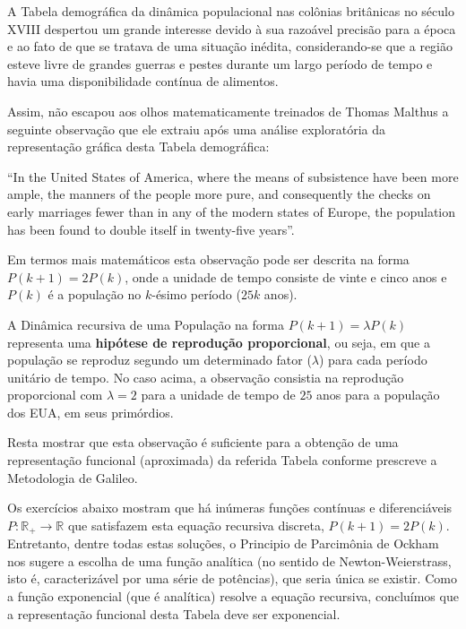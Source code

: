     A Tabela demográfica da dinâmica populacional nas colônias britânicas no século XVIII despertou um grande interesse devido à sua razoável precisão para a época e ao fato de que se tratava de uma situação inédita, considerando-se que a região esteve livre de grandes guerras e pestes durante um largo período de tempo e havia uma disponibilidade contínua de alimentos.

    Assim, não escapou aos olhos matematicamente treinados de Thomas Malthus a seguinte observação que ele extraiu após uma análise exploratória da representação gráfica desta Tabela demográfica:

\begin{citacao}
    ``In the United States of America, where the means of subsistence have been more ample, the manners of the people more pure, and consequently the checks on early marriages fewer than in any of the modern states of Europe, the population has been found to double itself in twenty-five years''.
    
\end{citacao}

    Em termos mais matemáticos esta observação pode ser descrita na forma \(P(k+1) = 2P(k)\), onde a unidade de tempo consiste de vinte e cinco anos e \(P(k)\) é a população no \(k\)-ésimo período (\(25k\) anos).

    A Dinâmica recursiva de uma População na forma \(P(k+1) = \lambda P(k)\) representa uma \textbf{hipótese de reprodução proporcional}, ou seja, em que a população se reproduz segundo um determinado fator (\(\lambda\)) para cada período unitário de tempo. No caso acima, a observação consistia na reprodução proporcional com \(\lambda = 2\) para a unidade de tempo de \(25\) anos para a população dos EUA, em seus primórdios.

    Resta mostrar que esta observação é suficiente para a obtenção de uma representação funcional (aproximada) da referida Tabela conforme prescreve a Metodologia de Galileo.

    Os exercícios abaixo mostram que há inúmeras funções contínuas e diferenciáveis \(P: \mathbb{R}_+ \to \mathbb{R}\) que satisfazem esta equação recursiva discreta, \(P(k+1) = 2P(k)\). Entretanto, dentre todas estas soluções, o Principio de Parcimônia de Ockham nos sugere a escolha de uma função analítica (no sentido de Newton-Weierstrass, isto é, caracterizável por uma série de potências), que seria única se existir. Como a função exponencial (que é analítica) resolve a equação recursiva, concluímos que a representação funcional desta Tabela deve ser exponencial.


